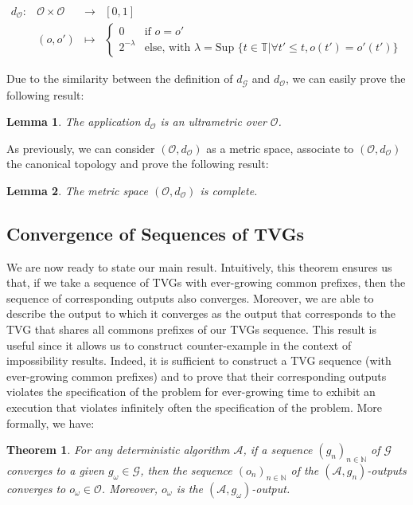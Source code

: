 \documentclass[11pt]{article}
\newtheorem{theorem}{Theorem}
\newtheorem{lemma}{Lemma}
\begin{document}
\[\begin{array}{rrcl}
d_\mathcal{O} : & \mathcal{O}\times\mathcal{O} & \longrightarrow & [0,1] \\
    & (o,o')                       & \mapsto &
\left\{\begin{array}{cl}
0 & \text{if } o=o'\\
2^{-\lambda} & \text{else, with } \lambda = \text{Sup }\{ t\in\mathbb{T}|\forall t'\leq t,o(t') = o'(t')\}
\end{array}\right.
\end{array}\]

Due to the similarity between the definition of $d_\mathcal{G}$ and $d_\mathcal{O}$, we can easily prove the following result:

\begin{lemma}\label{lem:doultrametric}
The application $d_\mathcal{O}$ is an ultrametric over $\mathcal{O}$.
\end{lemma} 

As previously, we can consider $(\mathcal{O}, d_\mathcal{O})$ as a metric space, associate to $(\mathcal{O}, d_\mathcal{O})$ the canonical topology and prove the following result:

\begin{lemma}\label{lem:ocomplete}
The metric space $(\mathcal{O}, d_\mathcal{O})$ is complete.
\end{lemma} 

\subsection{Convergence of Sequences of TVGs}\label{sub:convergence}

We are now ready to state our main result. Intuitively, this theorem ensures us that, if we take a sequence of TVGs with ever-growing common prefixes, then the sequence of corresponding outputs also converges. Moreover, we are able to describe the output to which it converges as the output that corresponds to the TVG that shares all commons prefixes of our TVGs sequence. This result is useful since it allows us to construct counter-example in the context of impossibility results. Indeed, it is sufficient to construct a TVG sequence (with ever-growing common prefixes) and to prove that their corresponding outputs violates the specification of the problem for ever-growing time to exhibit an execution that violates infinitely often the specification of the problem. More formally, we have:
 
\begin{theorem}\label{th:main}
For any deterministic algorithm $\mathcal{A}$, if a sequence $(g_n)_{n\in\mathbb{N}}$ of $\mathcal{G}$ converges to a given $g_\omega\in\mathcal{G}$, then the sequence $(o_n)_{n\in\mathbb{N}}$ of the $(\mathcal{A},g_n)$-outputs converges to $o_\omega\in\mathcal{O}$. Moreover, $o_\omega$ is the $(\mathcal{A},g_\omega)$-output.
\end{theorem}
\end{document}
